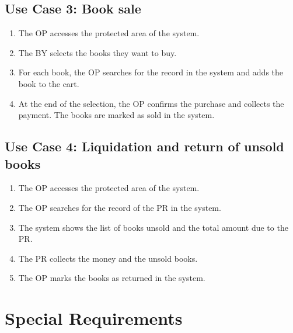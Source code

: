 \subsection{Use Case 3: Book sale}

\begin{enumerate}
    \item The OP accesses the protected area of the system.
    \item The BY selects the books they want to buy.
    \item For each book, the OP searches for the record in the system and adds the book to the cart.
    \item At the end of the selection, the OP confirms the purchase and collects the payment. The books are marked as sold in the system.
\end{enumerate}

\subsection{Use Case 4: Liquidation and return of unsold books}

\begin{enumerate}
    \item The OP accesses the protected area of the system.
    \item The OP searches for the record of the PR in the system.
    \item The system shows the list of books unsold and the total amount due to the PR.
    \item The PR collects the money and the unsold books.
    \item The OP marks the books as returned in the system.
\end{enumerate}

\section{Special Requirements}

